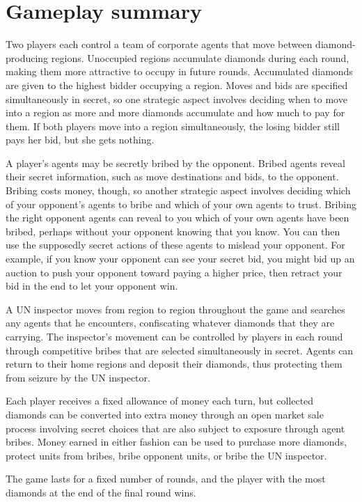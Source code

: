 \documentclass[8pt]{extarticle}
\begin{document}
\section{Gameplay summary}

Two players each control a team of corporate agents that move between diamond-producing regions.  Unoccupied regions accumulate diamonds during each round, making them more attractive to occupy in future rounds.  Accumulated diamonds are given to the highest bidder occupying a region.  Moves and bids are specified simultaneously in secret, so one strategic aspect involves deciding when to move into a region as more and more diamonds accumulate and how much to pay for them.  If both players move into a region simultaneously, the losing bidder still pays her bid, but she gets nothing.

A player's agents may be secretly bribed by the opponent.  Bribed agents reveal their secret information, such as move destinations and bids, to the opponent.  Bribing costs money, though, so another strategic aspect involves deciding which of your opponent's agents to bribe and which of your own agents to trust.  Bribing the right opponent agents can reveal to you which of your own agents have been bribed, perhaps without your opponent knowing that you know.  You can then use the supposedly secret actions of these agents to mislead your opponent.  For example, if you know your opponent can see your secret bid, you might bid up an auction to push your opponent toward paying a higher price, then retract your bid in the end to let your opponent win.

A UN inspector moves from region to region throughout the game and searches any agents that he encounters, confiscating whatever diamonds that they are carrying.  The inspector's movement can be controlled by players in each round through competitive bribes that are selected simultaneously in secret.  Agents can return to their home regions and deposit their diamonds, thus protecting them from seizure by the UN inspector.

Each player receives a fixed allowance of money each turn, but collected diamonds can be converted into extra money through an open market sale process involving secret choices that are also subject to exposure through agent bribes.  Money earned in either fashion can be used to purchase more diamonds, protect units from bribes, bribe opponent units, or bribe the UN inspector.  

The game lasts for a fixed number of rounds, and the player with the most diamonds at the end of the final round wins.
\end{document}
